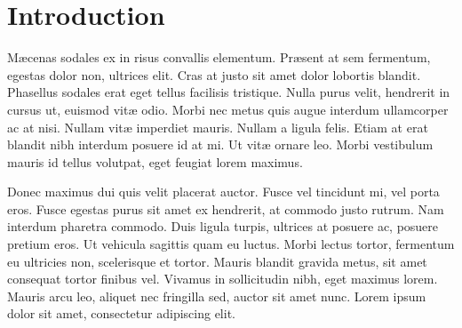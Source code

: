 %
%

%
%
%
%
%
%
%


\section{Introduction} %

M\ae{}cenas sodales ex in risus convallis elementum. Pr\ae{}sent at sem fermentum, egestas dolor non, ultrices elit. Cras at justo sit amet dolor lobortis blandit. Phasellus sodales erat eget tellus facilisis tristique. Nulla purus velit, hendrerit in cursus ut, euismod vit\ae{} odio. Morbi nec metus quis augue interdum ullamcorper ac at nisi. Nullam vit\ae{} imperdiet mauris. Nullam a ligula felis. Etiam at erat blandit nibh interdum posuere id at mi. Ut vit\ae{} ornare leo. Morbi vestibulum mauris id tellus volutpat, eget feugiat lorem maximus.

Donec maximus dui quis velit placerat auctor. Fusce vel tincidunt mi, vel porta eros. Fusce egestas purus sit amet ex hendrerit, at commodo justo rutrum. Nam interdum pharetra commodo. Duis ligula turpis, ultrices at posuere ac, posuere pretium eros. Ut vehicula sagittis quam eu luctus. Morbi lectus tortor, fermentum eu ultricies non, scelerisque et tortor. Mauris blandit gravida metus, sit amet consequat tortor finibus vel. Vivamus in sollicitudin nibh, eget maximus lorem. Mauris arcu leo, aliquet nec fringilla sed, auctor sit amet nunc. Lorem ipsum dolor sit amet, consectetur adipiscing elit. 

